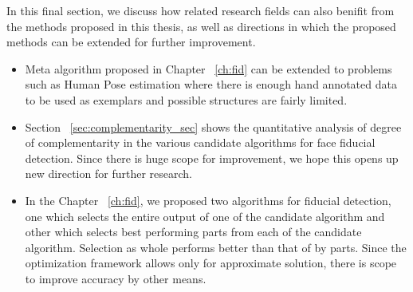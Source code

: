 In this final section, we discuss how related research fields can also benifit from 
the methods proposed in this thesis, as well as directions in which the proposed methods
can be extended for further improvement.
\begin{itemize}
    \item Meta algorithm proposed in Chapter ~\ref{ch:fid} can be extended to problems such
    as Human Pose estimation where there is enough hand annotated data to be used as exemplars
    and possible structures are fairly limited.
    \item Section ~\ref{sec:complementarity_sec} shows the quantitative analysis of degree of 
    complementarity in the various candidate algorithms for face fiducial detection. Since there 
    is huge scope for improvement, we hope this opens up new direction for further research.
    \item In the Chapter ~\ref{ch:fid}, we proposed two algorithms for fiducial detection, one which selects the entire output
    of one of the candidate algorithm and other which selects best performing parts from each of the
    candidate algorithm. Selection as whole performs better than that of by parts. Since the 
    optimization framework allows only for approximate solution, there is scope to improve accuracy by other means. 
\end{itemize}

